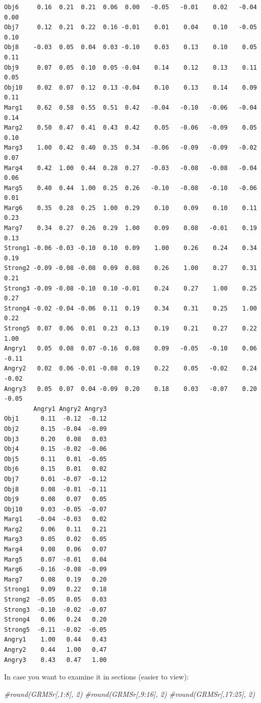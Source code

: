 \documentclass[
  english,
]{book}
\newenvironment{Shaded}{\begin{snugshade}}{\end{snugshade}}
\newcommand{\CommentTok}[1]{\textcolor[rgb]{0.56,0.35,0.01}{\textit{#1}}}
\begin{document}
\begin{verbatim}
Obj6     0.16  0.21  0.21  0.06  0.00   -0.05   -0.01    0.02   -0.04    0.00
Obj7     0.12  0.21  0.22  0.16 -0.01    0.01    0.04    0.10   -0.05    0.10
Obj8    -0.03  0.05  0.04  0.03 -0.10    0.03    0.13    0.10    0.05    0.11
Obj9     0.07  0.05  0.10  0.05 -0.04    0.14    0.12    0.13    0.11    0.05
Obj10    0.02  0.07  0.12  0.13 -0.04    0.10    0.13    0.14    0.09    0.11
Marg1    0.62  0.58  0.55  0.51  0.42   -0.04   -0.10   -0.06   -0.04    0.14
Marg2    0.50  0.47  0.41  0.43  0.42    0.05   -0.06   -0.09    0.05    0.10
Marg3    1.00  0.42  0.40  0.35  0.34   -0.06   -0.09   -0.09   -0.02    0.07
Marg4    0.42  1.00  0.44  0.28  0.27   -0.03   -0.08   -0.08   -0.04    0.06
Marg5    0.40  0.44  1.00  0.25  0.26   -0.10   -0.08   -0.10   -0.06    0.01
Marg6    0.35  0.28  0.25  1.00  0.29    0.10    0.09    0.10    0.11    0.23
Marg7    0.34  0.27  0.26  0.29  1.00    0.09    0.08   -0.01    0.19    0.13
Strong1 -0.06 -0.03 -0.10  0.10  0.09    1.00    0.26    0.24    0.34    0.19
Strong2 -0.09 -0.08 -0.08  0.09  0.08    0.26    1.00    0.27    0.31    0.21
Strong3 -0.09 -0.08 -0.10  0.10 -0.01    0.24    0.27    1.00    0.25    0.27
Strong4 -0.02 -0.04 -0.06  0.11  0.19    0.34    0.31    0.25    1.00    0.22
Strong5  0.07  0.06  0.01  0.23  0.13    0.19    0.21    0.27    0.22    1.00
Angry1   0.05  0.08  0.07 -0.16  0.08    0.09   -0.05   -0.10    0.06   -0.11
Angry2   0.02  0.06 -0.01 -0.08  0.19    0.22    0.05   -0.02    0.24   -0.02
Angry3   0.05  0.07  0.04 -0.09  0.20    0.18    0.03   -0.07    0.20   -0.05
        Angry1 Angry2 Angry3
Obj1      0.11  -0.12  -0.12
Obj2      0.15  -0.04  -0.09
Obj3      0.20   0.08   0.03
Obj4      0.15  -0.02  -0.06
Obj5      0.11   0.01  -0.05
Obj6      0.15   0.01   0.02
Obj7      0.01  -0.07  -0.12
Obj8      0.08  -0.01  -0.11
Obj9      0.08   0.07   0.05
Obj10     0.03  -0.05  -0.07
Marg1    -0.04  -0.03   0.02
Marg2     0.06   0.11   0.21
Marg3     0.05   0.02   0.05
Marg4     0.08   0.06   0.07
Marg5     0.07  -0.01   0.04
Marg6    -0.16  -0.08  -0.09
Marg7     0.08   0.19   0.20
Strong1   0.09   0.22   0.18
Strong2  -0.05   0.05   0.03
Strong3  -0.10  -0.02  -0.07
Strong4   0.06   0.24   0.20
Strong5  -0.11  -0.02  -0.05
Angry1    1.00   0.44   0.43
Angry2    0.44   1.00   0.47
Angry3    0.43   0.47   1.00
\end{verbatim}

In case you want to examine it in sections (easier to view):

\begin{Shaded}
\begin{Highlighting}[]
\CommentTok{#round(GRMSr[,1:8], 2)}
\CommentTok{#round(GRMSr[,9:16], 2)}
\CommentTok{#round(GRMSr[,17:25], 2)}
\end{Highlighting}
\end{Shaded}
\end{document}
